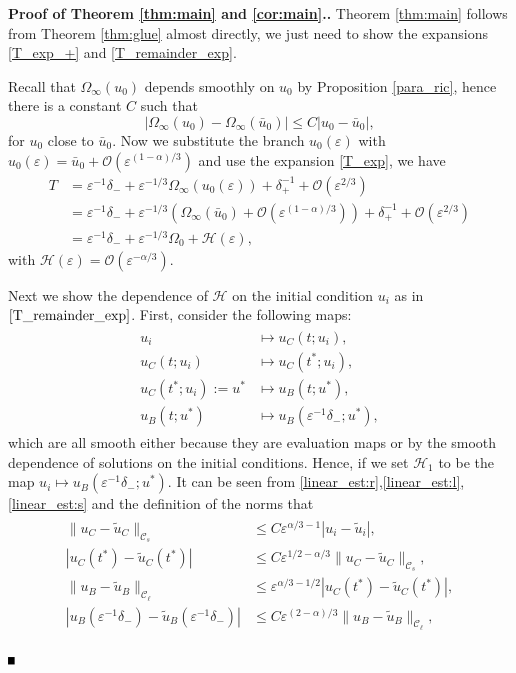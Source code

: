 \documentclass[letterpaper,11pt]{article}
\newcommand{\rmO}{\mathcal{O}}
\newcommand{\eps}{\varepsilon}
\numberwithin{equation}{section}
\theoremstyle{plain}
\newenvironment{Proof}[1][\unskip]%
 {\begin{trivlist} \item[]{\bf Proof #1. }}%
 {\hspace*{\fill}$\rule{.4\baselineskip}{.4\baselineskip}$\end{trivlist}}
\begin{document}
\begin{Proof}[\textbf{ of Theorem \ref{thm:main} and \ref{cor:main}}.]
Theorem \ref{thm:main} follows from Theorem \ref{thm:glue} almost directly, we just need to show the expansions \eqref{T_exp_+} and \eqref{T_remainder_exp}. 

Recall that $\Omega_\infty(u_0)$ depends smoothly on $u_0$ by Proposition \ref{para_ric}, hence there is a constant $C$ such that
\[
|\Omega_\infty(u_0) - \Omega_\infty(\bar{u}_0)| \le C|u_0 - \bar{u}_0|,
\]
for $u_0$ close to $\bar{u}_0$. Now we substitute the branch $u_0(\eps)$ with $u_0(\eps)  =\bar{u}_0 + \rmO(\eps^{(1-\alpha)/3})$ and use the expansion \eqref{T_exp}, we have
\begin{align*}
T &= \eps^{-1}\delta_- + \eps^{-1/3}\Omega_\infty(u_0(\eps)) + \delta_+^{-1} + \rmO(\eps^{2/3})\\
&= \eps^{-1}\delta_- + \eps^{-1/3}(\Omega_\infty(\bar{u}_0) + \rmO(\eps^{(1-\alpha)/3}))+\delta_+^{-1} + \rmO(\eps^{2/3}) \\
&= \eps^{-1}\delta_- + \eps^{-1/3}\Omega_0 + \mathcal{H}(\eps),
\end{align*}
with $\mathcal{H}(\eps) = \rmO(\eps^{-\alpha/3})$.

Next we show the dependence of $\mathcal{H}$ on the initial condition $u_i$ as in $\eqref{T_remainder_exp}$. First, consider the following maps:
\begin{align*}
\begin{split}
u_i &\mapsto u_C(t;u_i),\\
u_C(t;u_i) &\mapsto u_C(t^*; u_i), \\
u_C(t^*; u_i):= u^* &\mapsto u_B(t; u^*), \\
u_B(t;u^*) &\mapsto u_B(\eps^{-1}\delta_-; u^*),
\end{split}
\end{align*}
which are all smooth either because they are evaluation maps or by the smooth dependence of solutions on the initial conditions. Hence, if we set $\mathcal{H}_1$ to be the map $u_i\mapsto u_B(\eps^{-1}\delta_-;u^*)$. It can be seen from \eqref{linear_est:r},\eqref{linear_est:l}, \eqref{linear_est:s} and the definition of the norms that
\begin{align*}
\begin{split}
\|u_C - \tilde{u}_C\|_{\mathcal{C}_s} &\le C\eps^{\alpha/3-1}|u_i -\tilde{u}_i| ,\\
|u_C(t^*) - \tilde{u}_C(t^*)| &\le C\eps^{1/2-\alpha/3}\|u_C - \tilde{u}_C\|_{\mathcal{C}_s}, \\
\|u_B - \tilde{u}_B\|_{\mathcal{C}_\ell} &\le \eps^{\alpha/3-1/2}|u_C(t^*) - \tilde{u}_C(t^*)|, \\
|u_B(\eps^{-1}\delta_-)-\tilde{u}_B(\eps^{-1}\delta_-)| &\le C\eps^{(2-\alpha)/3}\|u_B - \tilde{u}_B\|_{\mathcal{C}_\ell},
\end{split}
\end{align*}


\end{Proof}
\end{document}
